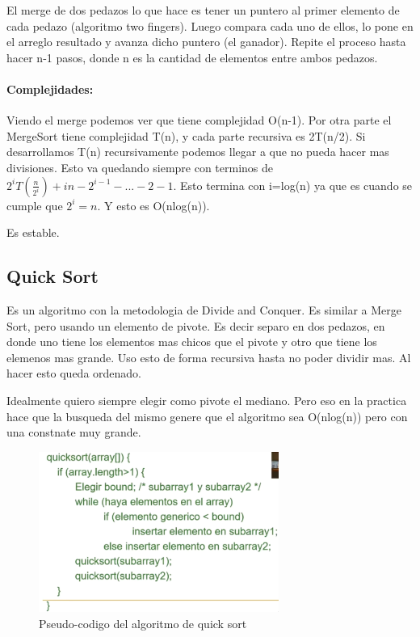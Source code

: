 \documentclass[11pt]{article}
\begin{document}
El merge de dos pedazos lo que hace es tener un puntero al primer
elemento de cada pedazo (algoritmo two fingers).
Luego compara cada uno de ellos, lo pone en el arreglo resultado y avanza
dicho puntero (el ganador).
Repite el proceso hasta hacer n-1 pasos, donde n es la cantidad de elementos
entre ambos pedazos.

\paragraph{Complejidades:}
Viendo el merge podemos ver que tiene complejidad O(n-1).
Por otra parte el MergeSort tiene complejidad T(n), y cada parte recursiva
es 2T(n/2).
Si desarrollamos T(n) recursivamente podemos llegar a que no pueda
hacer mas divisiones.
Esto va quedando siempre con terminos de $2^iT(\frac{n}{2^i})+in-2^{i-1}-...-2-1$.
Esto termina con i=log(n) ya que es cuando se cumple que $2^i=n$.
Y esto es O(nlog(n)).

Es estable.
\subsection{Quick Sort}
Es un algoritmo con la metodologia de Divide and Conquer.
Es similar a Merge Sort, pero usando un elemento de pivote.
Es decir separo en dos pedazos, en donde uno tiene los elementos mas chicos
que el pivote y otro que tiene los elemenos mas grande.
Uso esto de forma recursiva hasta no poder dividir mas.
Al hacer esto queda ordenado.

Idealmente quiero siempre elegir como pivote el mediano.
Pero eso en la practica hace que la busqueda del mismo genere
que el algoritmo sea O(nlog(n)) pero con una constnate muy grande.

\begin{figure}[h!]
    \centering
    \includegraphics[width=0.7\textwidth]{quicksort.png}
    \caption{Pseudo-codigo del algoritmo de quick sort}
    \label{fig:quicksort}
\end{figure}
\end{document}
